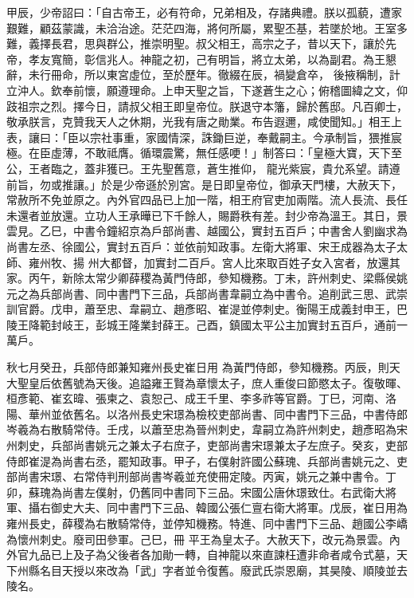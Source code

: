 \begin{pinyinscope}
 甲辰，少帝詔曰：「自古帝王，必有符命，兄弟相及，存諸典禮。朕以孤藐，遭家艱難，顧茲蒙識，未洽治途。茫茫四海，將何所屬，累聖丕基，若墜於地。王室多難，義擇長君，思與群公，推崇明聖。叔父相王，高宗之子，昔以天下，讓於先帝，孝友寬簡，彰信兆人。神龍之初，己有明旨，將立太弟，以為副君。為王懇辭，未行冊命，所以東宮虛位，至於歷年。徹綴在辰，禍變倉卒，
 後掖稱制，計立沖人。欽奉前懷，願遵理命。上申天聖之旨，下遂蒼生之心；俯稽圖緯之文，仰跂祖宗之烈。擇今日，請叔父相王即皇帝位。朕退守本籓，歸於舊邸。凡百卿士，敬承朕言，克贊我天人之休期，光我有唐之勛業。布告遐邇，咸使聞知。」相王上表，讓曰：「臣以宗社事重，家國情深，誅鋤巨逆，奉戴嗣主。今承制旨，猥推宸極。在臣虛薄，不敢祗膺。循環震驚，無任感哽！」制答曰：「皇極大寶，天下至公，王者臨之，蓋非獲已。王先聖舊意，蒼生推仰，
 龍光紫宸，貴允系望。請遵前旨，勿或推讓。」於是少帝遜於別宮。是日即皇帝位，御承天門樓，大赦天下，常赦所不免並原之。內外官四品已上加一階，相王府官吏加兩階。流人長流、長任未還者並放還。立功人王承曄已下千餘人，賜爵秩有差。封少帝為溫王。其日，景雲見。乙巳，中書令鐘紹京為戶部尚書、越國公，實封五百戶；中書舍人劉幽求為尚書左丞、徐國公，實封五百戶：並依前知政事。左衛大將軍、宋王成器為太子太師、雍州牧、揚
 州大都督，加實封二百戶。宮人比來取百姓子女入宮者，放還其家。丙午，新除太常少卿薛稷為黃門侍郎，參知機務。丁未，許州刺史、梁縣侯姚元之為兵部尚書、同中書門下三品，兵部尚書韋嗣立為中書令。追削武三思、武崇訓官爵。戊申，蕭至忠、韋嗣立、趙彥昭、崔湜並停刺史。衡陽王成義封申王，巴陵王降範封岐王，彭城王隆業封薛王。己酉，鎮國太平公主加實封五百戶，通前一萬戶。



 秋七月癸丑，兵部侍郎兼知雍州長史崔日用
 為黃門侍郎，參知機務。丙辰，則天大聖皇后依舊號為天後。追謚雍王賢為章懷太子，庶人重俊曰節愍太子。復敬暉、桓彥範、崔玄暐、張柬之、袁恕己、成王千里、李多祚等官爵。丁巳，河南、洛陽、華州並依舊名。以洛州長史宋璟為檢校吏部尚書、同中書門下三品，中書侍郎岑羲為右散騎常侍。壬戌，以蕭至忠為晉州刺史，韋嗣立為許州刺史，趙彥昭為宋州刺史，兵部尚書姚元之兼太子右庶子，吏部尚書宋璟兼太子左庶子。癸亥，吏部
 侍郎崔湜為尚書右丞，罷知政事。甲子，右僕射許國公蘇瑰、兵部尚書姚元之、吏部尚書宋璟、右常侍判刑部尚書岑羲並充使冊定陵。丙寅，姚元之兼中書令。丁卯，蘇瑰為尚書左僕射，仍舊同中書同下三品。宋國公唐休璟致仕。右武衛大將軍、攝右御史大夫、同中書門下三品、韓國公張仁亶右衛大將軍。戊辰，崔日用為雍州長史，薛稷為右散騎常侍，並停知機務。特進、同中書門下三品、趙國公李嶠為懷州刺史。廢司田參軍。己巳，冊
 平王為皇太子。大赦天下，改元為景雲。內外官九品已上及子為父後者各加勛一轉，自神龍以來直諫枉遭非命者咸令式墓，天下州縣名目天授以來改為「武」字者並令復舊。廢武氏崇恩廟，其昊陵、順陵並去陵名。




\end{pinyinscope}
